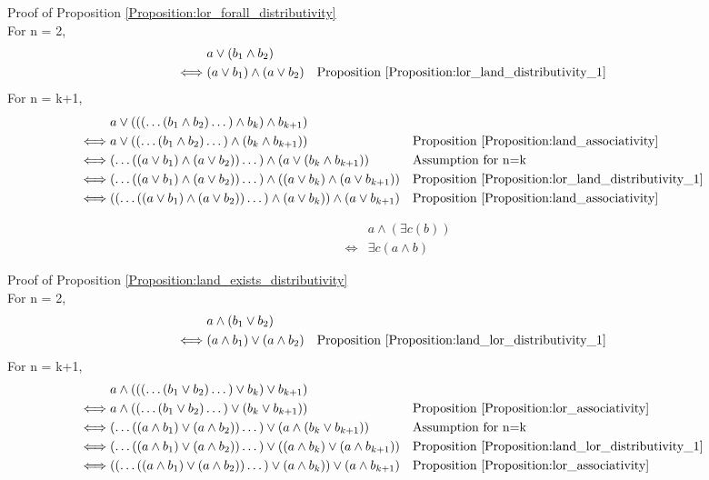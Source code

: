 Proof of Proposition \ref{Proposition:lor_forall_distributivity} \\
For n = 2,
\begin{align*}
& a \lor (b_1 \land b_2) \\
\iff & (a \lor b_1) \land (a \lor b_2)
& & \text{Proposition \ref{Proposition:lor_land_distributivity_1}} \\
\end{align*}
For n = k+1,
\begin{align*}
& a \lor ((( \dots (b_1 \land b_2) \dots ) \land b_k ) \land b_{k+1}) \\
\iff & a \lor (( \dots (b_1 \land b_2) \dots ) \land ( b_k \land b_{k+1}))
& & \text{Proposition \ref{Proposition:land_associativity}} \\
\iff & ( \dots ((a \lor b_1) \land (a \lor b_2)) \dots ) \land (a \lor (b_k \land b_{k+1}))
& & \text{Assumption for n=k} \\
\iff & ( \dots ((a \lor b_1) \land (a \lor b_2)) \dots ) \land ((a \lor b_k) \land (a \lor b_{k+1}))
& & \text{Proposition \ref{Proposition:lor_land_distributivity_1}} \\
\iff & (( \dots ((a \lor b_1) \land (a \lor b_2)) \dots ) \land (a \lor b_k)) \land (a \lor b_{k+1})
& & \text{Proposition \ref{Proposition:land_associativity}} \\
\end{align*}

\begin{prop}
\label{Proposition:land_exists_distributivity}
\begin{align*}
& a \land (\exists c (b)) \\
\iff & \exists c (a \land b)
\end{align*}
\end{prop}

Proof of Proposition \ref{Proposition:land_exists_distributivity} \\
For n = 2,
\begin{align*}
& a \land (b_1 \lor b_2) \\
\iff & (a \land b_1) \lor (a \land b_2)
& & \text{Proposition \ref{Proposition:land_lor_distributivity_1}} \\
\end{align*}
For n = k+1,
\begin{align*}
& a \land ((( \dots (b_1 \lor b_2) \dots ) \lor b_k ) \lor b_{k+1}) \\
\iff & a \land (( \dots (b_1 \lor b_2) \dots ) \lor ( b_k \lor b_{k+1}))
& & \text{Proposition \ref{Proposition:lor_associativity}} \\
\iff & ( \dots ((a \land b_1) \lor (a \land b_2)) \dots ) \lor (a \land (b_k \lor b_{k+1}))
& & \text{Assumption for n=k} \\
\iff & ( \dots ((a \land b_1) \lor (a \land b_2)) \dots ) \lor ((a \land b_k) \lor (a \land b_{k+1}))
& & \text{Proposition \ref{Proposition:land_lor_distributivity_1}} \\
\iff & (( \dots ((a \land b_1) \lor (a \land b_2)) \dots ) \lor (a \land b_k)) \lor (a \land b_{k+1})
& & \text{Proposition \ref{Proposition:lor_associativity}} \\
\end{align*}

